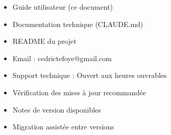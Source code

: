 \begin{description}[leftmargin=3cm, style=nextline]
    \item[Documentation]
    \begin{itemize}
        \item Guide utilisateur (ce document)
        \item Documentation technique (CLAUDE.md)
        \item README du projet
    \end{itemize}

    \item[Contact]
    \begin{itemize}
        \item Email : cedrictefoye@gmail.com
        \item Support technique : Ouvert aux heures ouvrables
    \end{itemize}

    \item[Mises à jour]
    \begin{itemize}
        \item Vérification des mises à jour recommandée
        \item Notes de version disponibles
        \item Migration assistée entre versions
    \end{itemize}
\end{description}

\newpage
